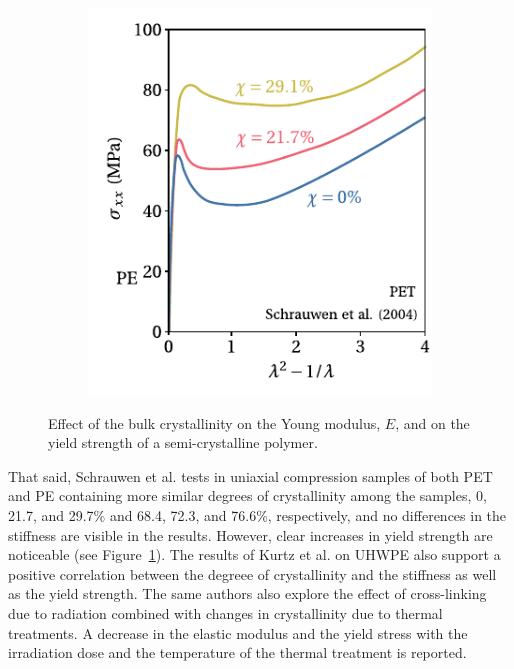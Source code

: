 \begin{figure}[hbtp]
\begin{subfigure}[b]{0.45\textwidth}
                            \includegraphics[width=\textwidth]{figures/deg_cryst_yield}
                            \caption{}
                            \label{subfig:deg_cryst_yield}
            \end{subfigure}
  \caption{Effect of the bulk crystallinity on  the Young modulus, $E$, and on the  yield strength of a semi-crystalline polymer.}
\label{fig:deg_cryst_stiff}
\end{figure}
That said, Schrauwen et al. \citep{schrauwenIntrinsicDeformationBehavior2004} tests in uniaxial compression samples of both PET and PE containing more similar degrees of crystallinity among the samples, 0, 21.7, and 29.7\% and 68.4, 72.3, and 76.6\%, respectively, and no differences in the stiffness are visible in the results.
However, clear increases in yield strength are noticeable (see Figure~\ref{subfig:deg_cryst_yield}).
The results of Kurtz et al. \citep{kurtzThermomechanicalBehaviorVirgin2002} on UHWPE also support a positive correlation between the degreee of crystallinity and the stiffness as well as the yield strength.
The same authors \citep{kurtzMiniatureSpecimenMechanical1999, kurtzThermomechanicalBehaviorVirgin2002} also explore the effect of cross-linking due to radiation combined with changes in crystallinity due to thermal treatments.
A decrease in the elastic modulus and the yield stress with the irradiation dose and the temperature of the thermal treatment is reported.

